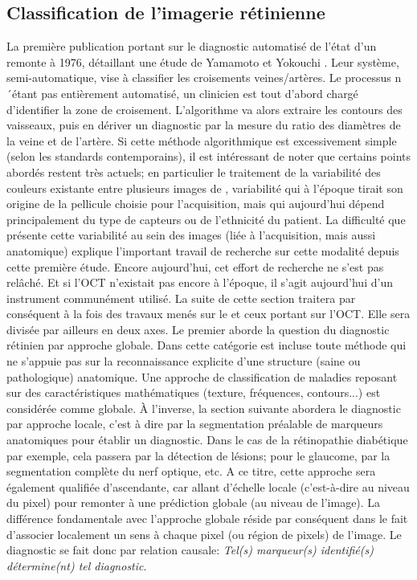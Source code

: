 \subsection{Classification de l'imagerie rétinienne}
La première publication portant sur le diagnostic automatisé de l'état d'un \fundus{} 
remonte à 1976, détaillant une étude de Yamamoto et Yokouchi \cite{yamamotoAutomaticRecognitionColor1976b}. Leur système, semi-automatique, vise à classifier les croisements veines/artères. Le processus n´étant pas entièrement automatisé, un clinicien est tout d'abord chargé d'identifier la zone de croisement. L'algorithme va alors extraire les contours des vaisseaux, puis en dériver un diagnostic par la mesure du ratio des diamètres de la veine et de l'artère. Si cette méthode algorithmique est excessivement simple (selon les standards contemporains), il est intéressant de noter que certains points abordés restent très actuels; en particulier le traitement de la variabilité des couleurs existante entre plusieurs images de \fundus, variabilité qui à l'époque tirait son origine de la pellicule choisie pour l'acquisition, mais qui aujourd'hui dépend principalement du type de capteurs ou de l'ethnicité du patient. La difficulté que présente cette variabilité au sein des images (liée à l'acquisition, mais aussi anatomique) explique l'important travail de recherche sur cette modalité depuis cette première étude. Encore aujourd'hui, cet effort de recherche ne s'est pas relâché.
Et si l'\ac{OCT} n'existait pas encore à l'époque, il s'agit aujourd'hui d'un instrument communément utilisé. La suite de cette section traitera par conséquent à la fois des travaux menés sur le \fundus{} et ceux portant sur l'OCT. Elle sera divisée par ailleurs en deux axes.
Le premier aborde la question du diagnostic rétinien par approche globale. Dans cette catégorie est incluse toute méthode qui ne s'appuie pas sur la reconnaissance explicite d'une structure (saine ou pathologique) anatomique. Une approche de classification de maladies reposant sur des caractéristiques mathématiques (texture, fréquences, contours...) est considérée comme globale. À l'inverse, la section suivante abordera le diagnostic par approche locale, c'est à dire par la segmentation préalable de marqueurs anatomiques pour établir un diagnostic. Dans le cas de la rétinopathie diabétique par exemple, cela passera par la détection de lésions; pour le glaucome, par la segmentation complète du nerf optique, etc. A ce titre, cette approche sera également qualifiée d'ascendante, car allant d'échelle locale (c'est-à-dire au niveau du pixel) pour remonter à une prédiction globale (au niveau de l'image). La différence fondamentale avec l'approche globale réside par conséquent dans le fait d'associer localement un sens à chaque pixel (ou région de pixels) de l'image. Le diagnostic se fait donc par relation causale: \textit{Tel(s) marqueur(s) identifié(s) détermine(nt) tel diagnostic}.
